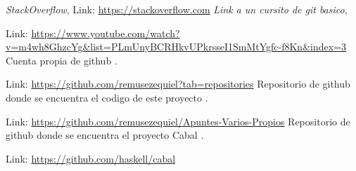 \documentclass[10pt,journal,compsoc]{IEEEtran}
\begin{document}
\newpage
\begin{thebibliography}{1}
%
 \emph{StackOverflow}, 
 Link: \textcolor{Red}{\url{https://stackoverflow.com}}
%
 \emph{Link a un cursito de git basico}, 
 
 Link: \textcolor{Red}{\url{https://www.youtube.com/watch?v=m4wh8GhzcYg&list=PLmUnyBCRHkvUPkrsseI1SmMtYgfc-f8Kn&index=3}}
Cuenta propia de github \emph{}.

 Link: \textcolor{Red}{\url{https://github.com/remusezequiel?tab=repositories}}
% 
%
Repositorio de github donde se encuentra el codigo de este proyecto  \emph{}.

 Link: \textcolor{Red}{\url{https://github.com/remusezequiel/Apuntes-Varios-Propios}}
% 
%
Repositorio de github donde se encuentra el proyecto Cabal  \emph{}.

 Link: \textcolor{Red}{\url{https://github.com/haskell/cabal}}


\end{thebibliography}
\end{document}
